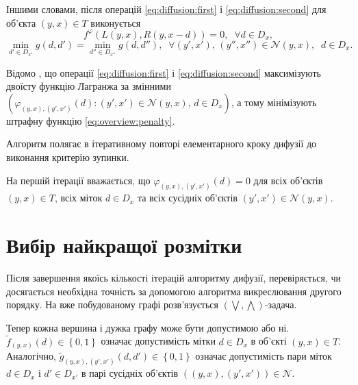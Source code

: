 Іншими словами, після операцій \ref{eq:diffusion:first} і
\ref{eq:diffusion:second} для об'єкта $\left(y, x \right) \in T$ виконується
\begin{equation*}
    f^{\varphi} \left(
        L \left(y, x\right) , R \left(y, x - d \right)
    \right) = 0, \; \; \forall d \in D_x,
\end{equation*}
\begin{equation*}
    \min \limits_{d' \in D_{x'}} g \left( d, d' \right)
    = \min \limits_{d'' \in D_{x''}} g \left( d, d'' \right), \; \;
    \forall \left(y', x' \right), \,
        \left(y'', x'' \right) \in \mathcal{N} \left(y, x \right), \; \;
    d \in D_x.
\end{equation*}


Відомо \cite{overview:savchynskyy:diffusion},
що операції \ref{eq:diffusion:first} і
\ref{eq:diffusion:second} максимізують двоїсту функцію Лагранжа за змінними
$\left(
    \varphi_{\left(y, x \right), \left(y', x' \right)} \left(d \right) :
    \left(y', x' \right) \in \mathcal{N} \left(y, x \right), \,
    d \in D_x
\right)$, а тому мінімізують штрафну функцію \ref{eq:overview:penalty}.

Алгоритм полягає в ітеративному повторі елементарного кроку дифузії до виконання
критерію зупинки.

На першій ітерації вважається, що
$\varphi_{\left(y, x \right), \left(y', x' \right)} \left(d \right) = 0$
для всіх об'єктів $\left(y, x \right) \in T$, всіх міток $d \in D_x$
та всіх сусідніх об'єктів
$\left(y', x' \right) \in \mathcal{N} \left(y, x \right)$.

\section{Вибір найкращої розмітки}


Після завершення якоїсь кількості ітерацій алгоритму дифузії,
перевіряється, чи досягається необхідна точність за допомогою
алгоритма викреслювання другого порядку.
На вже побудованому графі розв'язується
$\left( \bigvee, \bigwedge \right)$-задача.


Тепер кожна вершина і дужка графу може бути допустимою або ні.
$\tilde{f}_{\left(y, x \right)} \left(d \right) \in \left\{ 0, 1 \right\}$
означає допустимість мітки
$d \in D_x$ в об'єкті $\left(y,x \right) \in T$.
Аналогічно,
$\tilde{g}_{\left(y,x \right), \left(y', x' \right)} \left(d, d' \right)
    \in \left\{ 0, 1 \right\}$
означає допустимість пари міток $d \in D_x$ і $d' \in D_{x'}$
в парі сусідніх об'єктів
$\left( \left(y,x \right), \left(y', x' \right) \right) \in \mathcal{N}$.

